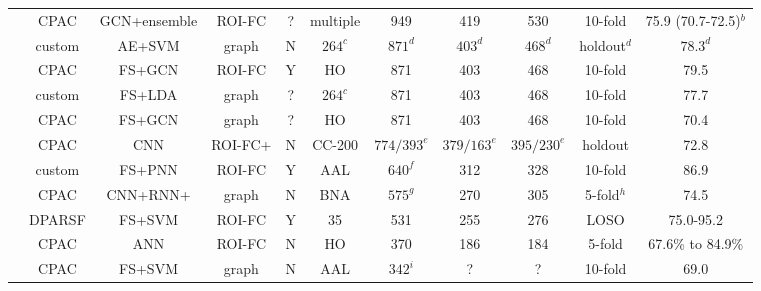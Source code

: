 \documentclass[10pt]{article}
\begin{document}
\begin{landscape}
\begin{table}
\begin{tabular}{lcccccccccc}
    \citeauthor{wangMAGEAutomaticDiagnosis2021}                        &   CPAC   &GCN+ensemble&ROI-FC&   ?    &  multiple  &  949  &  419  &  530  &  10-fold   & 75.9 (70.7-72.5)\(^b\)  \\
    \citeauthor{yinDiagnosisAutismSpectrum2021}                        &  custom  & AE+SVM &  graph   &   N    & \(264^c\)  & \(871^d\) & \(403^d\) & \(468^d\)  &  holdout\(^d\) & \(78.3^d\) \\
    \citeauthor{shaoClassificationASDBased2021}                        &   CPAC   & FS+GCN &  ROI-FC  &   Y    &     HO     &  871  &  403  &  468  &  10-fold   &       79.5       \\
    \citeauthor{mostafaDiagnosisAutismSpectrum2019}                    &  custom  & FS+LDA &  graph   &   ?    & \(264^c\)  &  871  &  403  &  468  &  10-fold   &       77.7       \\
    \citeauthor{parisotDiseasePredictionUsing2018}                     &   CPAC   & FS+GCN &  graph   &   ?    &     HO     &  871  &  403  &  468  &  10-fold   &       70.4       \\
    \citeauthor{khoslaEnsembleLearning3D2019}                          &   CPAC   &  CNN   &  ROI-FC+ &   N    &   CC-200  &\(774/393^e\)&\(379/163^e\)&\(395/230^e\)&holdout& 72.8 \\
    \citeauthor{iidakaRestingStateFunctional2015}                      &  custom  & FS+PNN &  ROI-FC  &   Y    &     AAL   &\(640^f\)& 312  &  328  &  10-fold   &       86.9       \\
    \citeauthor{byeonArtificialNeuralNetwork2020}                      &   CPAC  & CNN+RNN+ & graph   &   N    &     BNA    &\(575^g\)& 270 &  305  & 5-fold\(^h\)&       74.5      \\
    \citeauthor{wangFunctionalConnectivitybasedClassification2019}     &  DPARSF  & FS+SVM &  ROI-FC  &   Y    &     35     &  531  &  255  &  276  &   LOSO    &      75.0-95.2    \\
    \citeauthor{liMultisiteFMRIAnalysis2020}                           &   CPAC   &  ANN   &  ROI-FC  &   N    &     HO     &  370  &  186  &  184  &   5-fold   & 67.6\% to 84.9\% \\
    \citeauthor{kazeminejadTopologicalPropertiesRestingState2019}      &   CPAC   & FS+SVM &  graph   &   N    &     AAL   &\(342^i\)&  ?   &   ?   &  10-fold   &       69.0       \\

\end{tabular}
\end{table}
\end{landscape}
\end{document}
